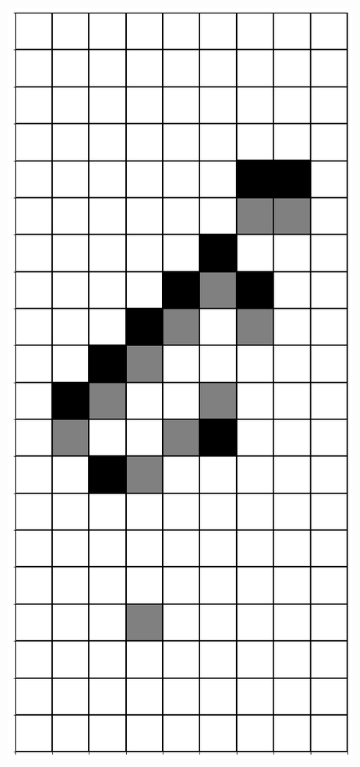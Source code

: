 \documentclass[12pt]{article}
\numberwithin{figure}{section} %
\begin{document}
\begin{figure}[H]
\begin{subfigure}{0.3\textwidth}
     \subcaption{}
   \end{subfigure}
        \begin{subfigure}{0.3\textwidth}
     \centering
     \includegraphics[angle=270,width=\linewidth]{Section4/22.5}

\end{subfigure}
\end{figure}
\end{document}
